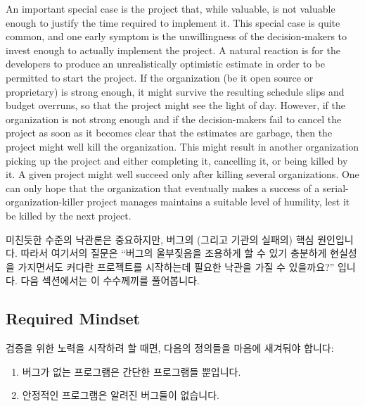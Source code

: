 An important special case is the project that, while valuable, is not
valuable enough to justify the time required to implement it.
This special case is quite common, and one early symptom is the
unwillingness of the decision-makers to invest enough to actually
implement the project.
A natural reaction is for the developers to produce an unrealistically
optimistic estimate in order to be permitted to start the project.
If the organization (be it open source or proprietary) is strong enough,
it might survive the resulting schedule slips and budget overruns,
so that the project might see the light of day.
However, if the organization is not strong enough and if the decision-makers
fail to cancel the project as soon as it becomes clear that the estimates
are garbage, then the project might well kill the organization.
This might result in another organization picking up the project and
either completing it, cancelling it, or being killed by it.
A given project might well succeed only after killing several
organizations.
One can only hope that the organization that eventually makes a success
of a serial-organization-killer project manages maintains a suitable
level of humility, lest it be killed by the next project.
\fi

미친듯한 수준의 낙관론은 중요하지만, 버그의 (그리고 기관의 실패의) 핵심
원인입니다.
따라서 여기서의 질문은 ``버그의 울부짖음을 조용하게 할 수 있기 충분하게
현실성을 가지면서도 커다란 프로젝트를 시작하는데 필요한 낙관을 가질 수
있을까요?'' 입니다.
다음 섹션에서는 이 수수께끼를 풀어봅니다.

\subsection{Required Mindset}
\label{sec:debugging:Required Mindset}

검증을 위한 노력을 시작하려 할 때면, 다음의 정의들을 마음에 새겨둬야 합니다:

\begin{enumerate}
\item	버그가 없는 프로그램은 간단한 프로그램들 뿐입니다.
\item	안정적인 프로그램은 알려진 버그들이 없습니다.

\end{enumerate}


